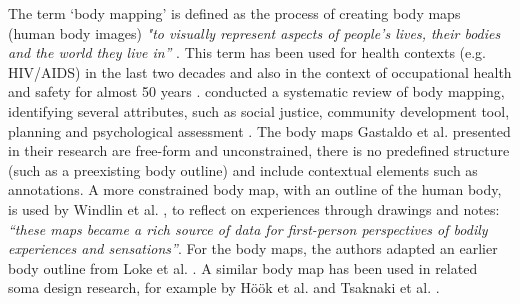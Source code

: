 The term ‘body mapping’ is defined as the process of creating body maps (human body images) \textit{"to visually represent aspects of people's lives, their bodies and the world they live in”} \cite{gastaldo_body-map_2012}. This term has been used for health contexts (e.g. HIV/AIDS) in the last two decades and also in the context of occupational health and safety for almost 50 years \cite{gastaldo_body-map_2012}. \citeauthor{de_jager_embodied_2016} conducted a systematic review of body mapping, identifying several attributes, such as social justice, community development tool, planning and psychological assessment \cite{de_jager_embodied_2016}. The body maps Gastaldo et al. presented in their research are free-form and unconstrained, there is no predefined structure (such as a preexisting body outline) and include contextual elements such as annotations. A more constrained body map, with an outline of the human body, is used by Windlin et al. \cite{windlin_soma_2019}, to reflect on experiences through drawings and notes: \textit{“these maps became a rich source of data for first-person perspectives of bodily experiences and sensations”}. For the body maps, the authors adapted an earlier body outline from Loke et al. \cite{loke_bodily_2012}. A similar body map has been used in related soma design research, for example by Höök et al. \cite{hook_soma_2019} and Tsaknaki et al. \cite{tsaknaki_teaching_2019}.


